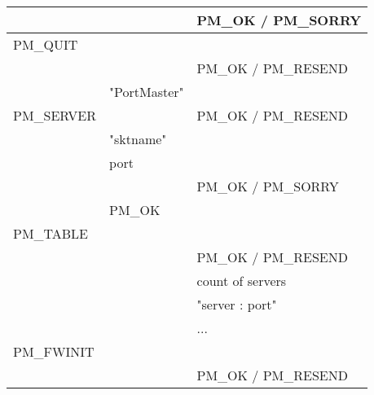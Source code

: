 \documentclass[12pt]{article}
\begin{document}
\begin{table}[thb]
\begin{center}
\begin{tabular}{||l|l|l||}
                                    &                                       & {\small PM\_OK / PM\_SORRY}                \\ \hline
   {\small PM\_QUIT}                &                                       &                                            \\
                                    &                                       & {\small PM\_OK / PM\_RESEND}               \\
                                    & "PortMaster"                          &                                            \\ \hline
   {\small PM\_SERVER}              &                                       & {\small PM\_OK / PM\_RESEND}               \\
                                    & "sktname"                             &                                            \\
                                    & port                                  &                                            \\
                                    &                                       & {\small PM\_OK / PM\_SORRY}                \\ \hline
                                    & {\small PM\_OK}                       &                                            \\ \hline
   {\small PM\_TABLE}               &                                       &                                            \\
                                    &                                       & {\small PM\_OK / PM\_RESEND}               \\
                                    &                                       & count of servers                           \\
                                    &                                       & "server : port"                            \\
                                    &                                       & ...                                        \\ \hline
   {\small PM\_FWINIT}              &                                       &                                            \\
                                    &                                       & {\small PM\_OK / PM\_RESEND}               \\
  \hline\hline
  \end{tabular}
  \end{center}
\end{table}
\end{document}
